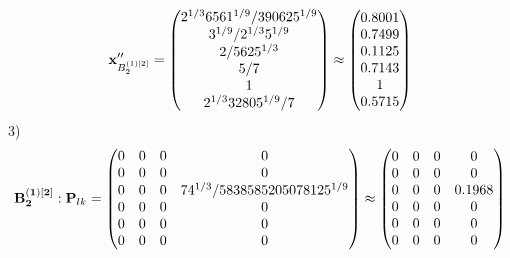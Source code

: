 \documentclass[10pt,a4paper]{article}
\begin{document}
	\[
		\bold{x}''_{B_2^{(1)[2]}} = 
		\begin{pmatrix}
			{{2^ {1 / 3}}{6561^ {1 / 9}}} / {{390625^ {1 / 9}}} \\
			{{3^ {1 / 9}}} / {{2^ {1 / 3}}{5^ {1 / 9}}} \\
			{{2}} / {{5625^ {1 / 3}}} \\
			{{5}} / {{7}} \\
			{1}{} \\
			{{2^ {1 / 3}}{32805^ {1 / 9}}} / {{7}} \\
		\end{pmatrix}
		\approx
		\begin{pmatrix}
			0.8001   \\
			0.7499   \\
			0.1125   \\
			0.7143   \\
			1        \\
			0.5715   \\
		\end{pmatrix}
	\]
	3)
	\[
		\bold{B_2^{(1)[2]}}: \bold{P}_{lk} = 
		\begin{pmatrix}
			{{0}}{} & {{0}}{} & {{0}}{} & {{0}}{} \\
			{{0}}{} & {{0}}{} & {{0}}{} & {{0}}{} \\
			{{0}}{} & {{0}}{} & {{0}}{} & {{7}{4^ {1 / 3}}} / {{5838585205078125^ {1 / 9}}} \\
			{{0}}{} & {{0}}{} & {{0}}{} & {{0}}{} \\
			{{0}}{} & {{0}}{} & {{0}}{} & {{0}}{} \\
			{{0}}{} & {{0}}{} & {{0}}{} & {{0}}{} \\
		\end{pmatrix}
		\approx
		\begin{pmatrix}
			0        & 0        & 0        & 0        \\
			0        & 0        & 0        & 0        \\
			0        & 0        & 0        & 0.1968   \\
			0        & 0        & 0        & 0        \\
			0        & 0        & 0        & 0        \\
			0        & 0        & 0        & 0        \\
		\end{pmatrix}
	\]
\end{document}

